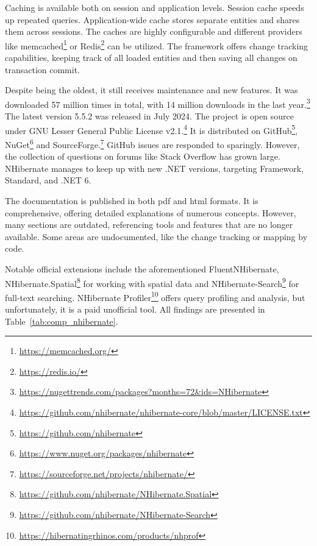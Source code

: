 Caching is available both on session and application levels. Session cache speeds up repeated queries. Application-wide cache stores separate entities and shares them across sessions. The caches are highly configurable and different providers like memcached\footnote{\url{https://memcached.org/}} or Redis\footnote{\url{https://redis.io/}} can be utilized.
The framework offers change tracking capabilities, keeping track of all loaded entities and then saving all changes on transaction commit.

Despite being the oldest, it still receives maintenance and new features. It was downloaded 57 million times in total, with 14 million downloads in the last year.\footnote{\url{https://nugettrends.com/packages?months=72&ids=NHibernate}} The latest version 5.5.2 was released in July 2024. The project is open source under GNU Lesser General Public License v2.1.\footnote{\url{https://github.com/nhibernate/nhibernate-core/blob/master/LICENSE.txt}} It is distributed on GitHub\footnote{\url{https://github.com/nhibernate}}, NuGet\footnote{\url{https://www.nuget.org/packages/nhibernate}} and SourceForge.\footnote{\url{https://sourceforge.net/projects/nhibernate/}} GitHub issues are responded to sparingly. However, the collection of questions on forums like Stack Overflow has grown large. NHibernate manages to keep up with new .NET versions, targeting Framework, Standard, and .NET 6.

The documentation is published in both \acrshort{pdf} and \acrshort{html} formats. It is comprehensive, offering detailed explanations of numerous concepts. However, many sections are outdated, referencing tools and features that are no longer available. Some areas are undocumented, like the change tracking or mapping by code.

Notable official extensions include the aforementioned FluentNHibernate, {NHibernate.Spatial}\footnote{\url{https://github.com/nhibernate/NHibernate.Spatial}} for working with spatial data and NHibernate-Search\footnote{\url{https://github.com/nhibernate/NHibernate-Search}} for full-text searching. NHibernate Profiler\footnote{\url{https://hibernatingrhinos.com/products/nhprof}} offers query profiling and analysis, but unfortunately, it is a paid unofficial tool. All findings are presented in Table~\ref{tab:comp_nhibernate}.


